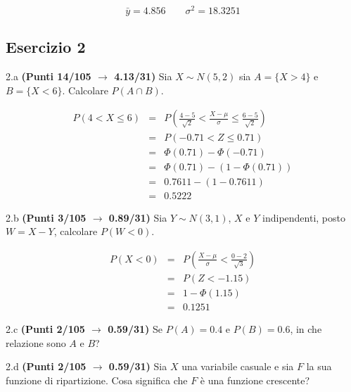 \documentclass[
  11pt,
]{book}
\theoremstyle{mytheoremstyle}
\theoremstyle{mydefstyle}
\newenvironment{sol}
  {
  \begin{tcolorbox}[enhanced,breakable,arc=0.1mm,boxrule=1pt,colback=white,colframe=iblue,
  title=\bf \fontfamily{lmss}\selectfont \hspace{.5 cm} Soluzione,drop fuzzy shadow]

}{
\end{tcolorbox}
  }
\begin{document}
\begin{sol}
\[
\bar y = 4.856\qquad \sigma^2 = 18.3251
\]

\end{sol}

\subsection{Esercizio 2}\label{esercizio-2-36}

2.a \textbf{(Punti 14/105 \(\rightarrow\) 4.13/31)} Sia \(X\sim N(5,2)\) sia \(A=\{X>4\}\) e \(B=\{X<6\}\). Calcolare \(P(A\cap B)\).

\begin{sol}
\begin{eqnarray*}
   P( 4 < X \leq  6 ) &=& P\left( \frac { 4  -  5 }{\sqrt{ 2 }} < \frac { X  -  \mu }{ \sigma } \leq \frac { 6  -  5 }{\sqrt{ 2 }}\right)  \\
              &=& P\left(  -0.71  < Z \leq  0.71 \right) \\
              &=& \Phi( 0.71 )-\Phi( -0.71 )\\
              &=&  \Phi( 0.71 )-(1-\Phi( 0.71 )) \\ &=&  0.7611 -(1- 0.7611 ) \\ 
              &=&  0.5222 
   \end{eqnarray*}

\end{sol}

2.b \textbf{(Punti 3/105 \(\rightarrow\) 0.89/31)} Sia \(Y\sim N(3,1)\), \(X\) e \(Y\) indipendenti, posto \(W=X-Y\), calcolare \(P(W<0)\).

\begin{sol}
\begin{eqnarray*}
      P( X   <   0 ) 
        &=& P\left(  \frac { X  -  \mu }{ \sigma }  <  \frac { 0  -  2 }{\sqrt{ 3 }} \right)  \\
                 &=& P\left(  Z   <   -1.15 \right) \\    
                 &=&  1-\Phi( 1.15 ) \\ &=&  0.1251 
      \end{eqnarray*}

\end{sol}

2.c \textbf{(Punti 2/105 \(\rightarrow\) 0.59/31)} Se \(P(A)=0.4\) e \(P(B)=0.6\), in che relazione sono \(A\) e \(B\)?

2.d \textbf{(Punti 2/105 \(\rightarrow\) 0.59/31)} Sia \(X\) una variabile casuale e sia \(F\) la sua funzione di ripartizione. Cosa significa che \(F\) è una funzione crescente?
\end{document}
